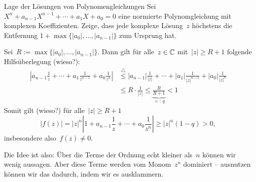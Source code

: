 \documentclass{algblatt}
\begin{document}
\vspace*{-1.5cm}

\begin{aufgabe}{Lage der Lösungen von Polynomengleichungen}
Sei $X^n + a_{n - 1} X^{n - 1} + \cdots + a_1 X + a_0 = 0$ eine normierte
Polynomgleichung mit komplexen Koeffizienten. Zeige, dass jede komplexe
Lösung~$z$ höchstens die Entfernung
$1+\max\{|a_0|,\ldots,|a_{n-1}|\}$ zum Ursprung hat.
\begin{loesung}
Sei~$R := \max\{ |a_0|,\ldots,|a_{n-1}| \}$. Dann gilt für
alle~$z \in \mathbb{C}$ mit~$|z| \geq R + 1$ folgende Hilfsüberlegung (wieso?):
\begin{align*}
  \left|a_{n-1} \frac{1}{z} + \cdots + a_1 \frac{1}{z^{n-1}} + a_0
  \frac{1}{z^n}\right| &\stackrel{\triangle}{\leq}
  |a_{n-1}| \frac{1}{|z|} + \cdots + |a_1| \frac{1}{|z|^{n-1}} + |a_0|
  \frac{1}{|z|^n} \\
  &\leq R \cdot \frac{1}{|z|}
  \leq \underbrace{\frac{R}{R+1}}_{=:\,q} < 1
\end{align*}
Somit gilt (wieso?) für alle~$|z| \geq R + 1$
\[ |f(z)| = |z|^n \left|1 + a_{n-1} \frac{1}{z} + \cdots + a_0 \frac{1}{z^n}\right|
  \geq |z|^n \left(1 - q\right) > 0, \]
insbesondere also~$f(z) \neq 0$.

Die Idee ist also: Über die Terme der Ordnung echt kleiner als~$n$ können wir
wenig aussagen. Aber diese Terme werden vom Monom~$z^n$ dominiert -- ausnutzen
können wir das dadurch, indem wir es ausklammern.
\end{loesung}
\end{aufgabe}
\end{document}
